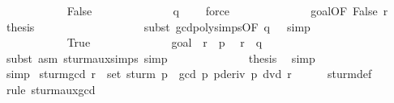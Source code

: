 \begin{isabellebody}
\ \ \ \ \ \ \ \ \ \ \isamarkupfalse%
\ False\isanewline
\ \ \ \ \ \ \ \ \ \ \ \ \isamarkupfalse%
\ {\isachardoublequoteopen}q\ {\isasymnoteq}\ {}{\isachardoublequoteclose}\ \isamarkupfalse%
\ force\isanewline
\ \ \ \ \ \ \ \ \ \ \ \ \isamarkupfalse%
\ goal{}{\isacharparenleft}{}{\isacharparenright}{\isacharbrackleft}OF\ False\ r{\isacharbrackright}\ \isamarkupfalse%
\ {\isacharquery}thesis\ \isanewline
\ \ \ \ \ \ \ \ \ \ \ \ \ \ \ \ \isamarkupfalse%
\ {\isacharparenleft}subst\ gcd{\isacharunderscore}poly{\isachardot}simps{\isacharparenleft}{}{\isacharparenright}{\isacharbrackleft}OF\ {\isacharbackquoteopen}q\ {\isasymnoteq}\ {}{\isacharbackquoteclose}{\isacharbrackright}{\isacharcomma}\ simp{\isacharparenright}\isanewline
\ \ \ \ \ \ \ \ \isamarkupfalse%
\isanewline
\ \ \ \ \ \ \ \ \ \ \isamarkupfalse%
\ True\isanewline
\ \ \ \ \ \ \ \ \ \ \ \ \isamarkupfalse%
\ goal{}{\isacharparenleft}{}{\isacharparenright}\ \ {\isacharbackquoteopen}r\ {\isasymnoteq}\ p{\isacharbackquoteclose}\ \isamarkupfalse%
\ {\isachardoublequoteopen}r\ {\isacharequal}\ q{\isachardoublequoteclose}\isanewline
\ \ \ \ \ \ \ \ \ \ \ \ \ \ \ \ \isamarkupfalse%
\ {\isacharparenleft}subst\ {\isacharparenleft}asm{\isacharparenright}\ sturm{\isacharunderscore}aux{\isachardot}simps{\isacharcomma}\ simp{\isacharparenright}\isanewline
\ \ \ \ \ \ \ \ \ \ \ \ \isamarkupfalse%
\ {\isacharquery}thesis\ \isamarkupfalse%
\ simp\isanewline
\ \ \ \ \ \ \ \ \isamarkupfalse%
\isanewline
\ \ \ \ \isamarkupfalse%
\ simp\isanewline
{}\isamarkupfalse%
%
\endisatagproof
{\isafoldproof}%
%
\isadelimproof
\isanewline
%
\endisadelimproof
\isanewline
{}\isamarkupfalse%
\ sturm{\isacharunderscore}gcd{\isacharcolon}\ {\isachardoublequoteopen}r\ {\isasymin}\ set\ {\isacharparenleft}sturm\ p{\isacharparenright}\ {\isasymLongrightarrow}\ gcd\ p\ {\isacharparenleft}pderiv\ p{\isacharparenright}\ dvd\ r{\isachardoublequoteclose}\isanewline
%
\isadelimproof
\ \ \ \ %
\endisadelimproof
%
\isatagproof
{}\isamarkupfalse%
\ sturm{\isacharunderscore}def\ \isamarkupfalse%
\ {\isacharparenleft}rule\ sturm{\isacharunderscore}aux{\isacharunderscore}gcd{\isacharparenright}%
\endisatagproof
{\isafoldproof}%
%
\isadelimproof

\end{isabellebody}

